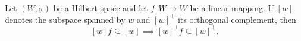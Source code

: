Let $(W, \sigma)$ be a Hilbert space and let $f \colon W \to W$ be a linear mapping. If $[w]$ denotes the subspace spanned by $w$ and $[w]^\perp$ its orthogonal complement, then
$$
[w]f \subseteq [w] \implies [w]^\perp f \subseteq [w]^\perp.
$$
